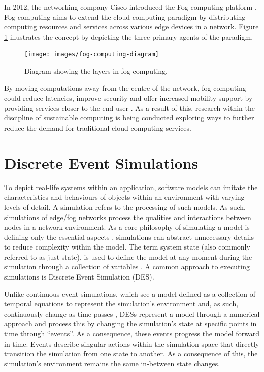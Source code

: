 \documentclass{l4proj}
\begin{document}
In 2012, the networking company Cisco introduced the Fog computing platform \citep{fog_computing}.
Fog computing aims to extend the cloud computing paradigm by distributing computing resources and services across various edge devices in a network.
Figure \ref{fig:fog-diagram} illustrates the concept by depicting the three primary agents of the paradigm.
\begin{figure}[h]
    \centering
    \texttt{[image: images/fog-computing-diagram]}
    ~
    \caption{Diagram showing the layers in fog computing.}
    \label{fig:fog-diagram}
\end{figure}
By moving computations away from the centre of the network, fog computing could reduce latencies, improve security and offer increased mobility support by providing services closer to the end user \citep{fog_computing}.
As a result of this, research within the discipline of sustainable computing \citep{sustainableFog} is being conducted exploring ways to further reduce the demand for traditional cloud computing services.

\section{Discrete Event Simulations}

To depict real-life systems within an application, software models can imitate the characteristics and behaviours of objects within an environment with varying levels of detail.
A simulation refers to the processing of such models.
As such, simulations of edge/fog networks process the qualities and interactions between nodes in a network environment.
As a core philosophy of simulating a model is defining only the essential aspects \citep{simulations}, simulations can abstract unnecessary details to reduce complexity within the model.
The term system state (also commonly referred to as just state), is used to define the model at any moment during the simulation through a collection of variables \citep{des-old}.
A common approach to executing simulations is Discrete Event Simulation (DES).

Unlike continuous event simulations, which see a model defined as a collection of temporal equations to represent the simulation's environment and, as such, continuously change as time passes \cite{simpy}, DESs represent a model through a numerical approach and process this by changing the simulation's state at specific points in time through ``events''.
As a consequence, these events progress the model forward in time.
Events describe singular actions within the simulation space that directly transition the simulation from one state to another.
As a consequence of this, the simulation's environment remains the same in-between state changes.
\end{document}
